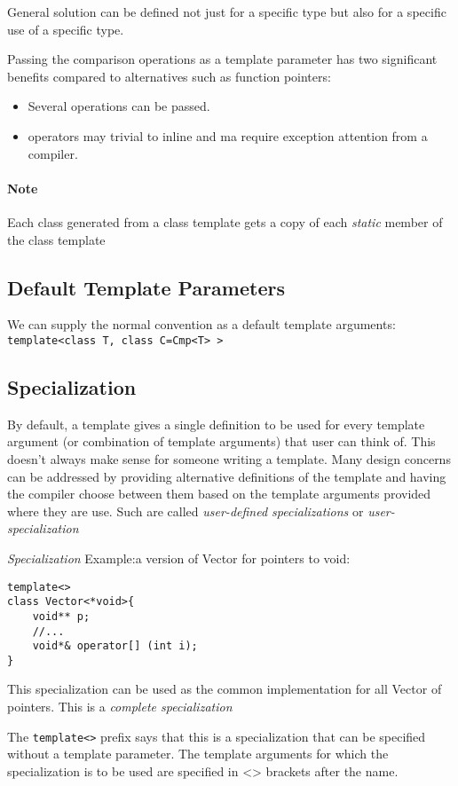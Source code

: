 \documentclass[11pt, a4paper]{book}
\begin{document}
\begin{itemize}
General solution can be defined not just for a specific type but also for a specific use of a specific type. 

Passing the comparison operations as a template parameter has two significant benefits compared to alternatives such as function pointers:
\begin{itemize}
	\item Several operations can be passed.
	\item operators may trivial to inline and ma require exception attention from a compiler.
\end{itemize}
\paragraph{Note} Each class generated from a class template gets a copy of each \emph{static} member of the class template

\subsection{Default Template Parameters}
We can supply the normal convention as a default template arguments:\\
\verb|template<class T, class C=Cmp<T> >|

\subsection{Specialization}
By default, a template gives a single definition to be used for every template argument (or combination of template arguments) that user can think of. This doesn't always make sense for someone writing a template. Many design concerns can be addressed by providing alternative definitions of the template and having the compiler choose between them based on the template arguments provided where they are use. Such are called \emph{user-defined specializations} or \emph{user-specialization}

\emph{Specialization} Example:a version of Vector for pointers to void:
\begin{verbatim}
template<>
class Vector<*void>{
    void** p;
    //...
    void*& operator[] (int i);
}
\end{verbatim}

This specialization can be used as the common implementation for all Vector of pointers. This is a \emph{complete specialization}

The \verb|template<>| prefix says that this is a specialization that can be specified without a template parameter. The template arguments for which the specialization is to be used are specified in <> brackets after the name.


\end{itemize}
\end{document}
